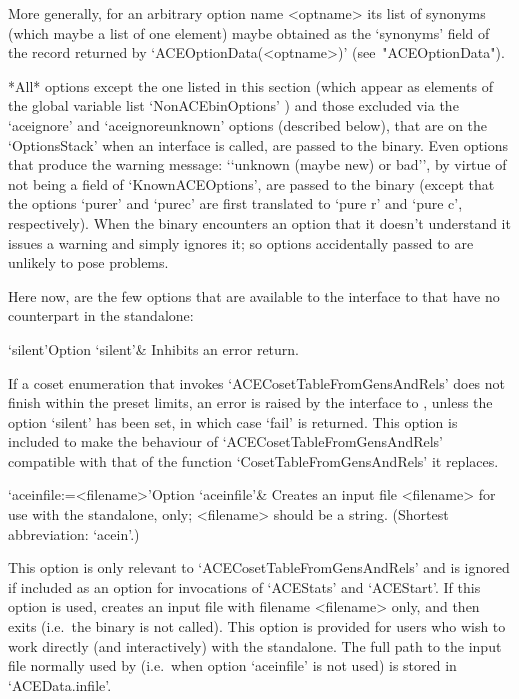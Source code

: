 More generally, for an arbitrary option name  <optname>  its  list  of
synonyms (which maybe a list of one element)  maybe  obtained  as  the
`synonyms' field of the record returned by  `ACEOptionData(<optname>)'
(see~"ACEOptionData").


*All* options except the one listed in this section (which  appear  as
elements of the global  variable  list  `NonACEbinOptions'{\undoquotes
{}}) and  those  excluded
via the `aceignore' and `aceignoreunknown' options (described  below),
that are on the `OptionsStack' when an {\ACE} interface is called, are
passed to the {\ACE} binary. Even options  that  produce  the  warning
message: \lq{}`unknown (maybe new) or bad'', by virtue of not being  a
field of `KnownACEOptions', are passed to the  {\ACE}  binary  (except
that the options `purer' and `purec' are first translated to `pure  r'
and `pure c', respectively). When  the  {\ACE}  binary  encounters  an
option that it doesn't understand  it  issues  a  warning  and  simply
ignores it; so options accidentally passed to {\ACE} are  unlikely  to
pose problems.

Here now, are the  few  options  that  are  available  to  the  {\GAP}
interface to {\ACE} that have no counterpart in the {\ACE} standalone:

\beginitems

\>`silent'{Option `silent'}& 
Inhibits an error return.

If a coset  enumeration  that  invokes  `ACECosetTableFromGensAndRels'
does not finish within the preset limits, an error is  raised  by  the
interface to {\GAP}, unless the option `silent' has been set, in which
case `fail' is returned. This option is included to make the behaviour
of `ACECosetTableFromGensAndRels' compatible with that of the function
`CosetTableFromGensAndRels' it replaces.

\>`aceinfile:=<filename>'{Option `aceinfile'}&
Creates an {\ACE} input file <filename> for use with  the  standalone,
only;  <filename>  should  be  a  string.
(Shortest abbreviation: `acein'.)

This option is only relevant to `ACECosetTableFromGensAndRels' and  is
ignored if included as an option for  invocations  of  `ACEStats'  and
`ACEStart'. If this option is used, {\GAP} creates an input file  with
filename <filename> only, and then exits (i.e.~the  {\ACE}  binary  is
not called). This option is  provided  for  users  who  wish  to  work
directly (and interactively) with the {\ACE} standalone. The full path
to  the  input  file  normally  used  by  {\ACE}   (i.e.~when   option
`aceinfile' is not used) is stored in `ACEData.infile'.


